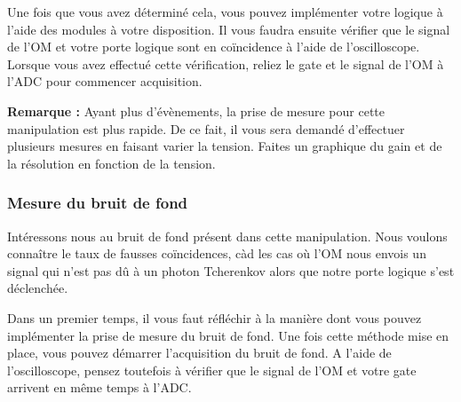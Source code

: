 Une fois que vous avez déterminé cela, vous pouvez implémenter votre logique à l'aide des modules à votre disposition. Il vous faudra ensuite vérifier que le signal de l'OM et votre porte logique sont en coïncidence à l'aide de l'oscilloscope. Lorsque vous avez effectué cette vérification, reliez le gate et le signal de l'OM à l'ADC pour commencer acquisition.

\textbf{Remarque :} Ayant plus d'évènements, la prise de mesure pour cette manipulation est plus rapide. De ce fait, il vous sera demandé d'effectuer plusieurs mesures en faisant varier la tension. Faites un graphique du gain et de la résolution en fonction de la tension.


\subsubsection{Mesure du bruit de fond}
Intéressons nous au bruit de fond présent dans cette manipulation. Nous voulons connaître le taux de fausses coïncidences, càd les cas où l'OM nous envois un signal qui n'est pas dû à un photon Tcherenkov alors que notre porte logique s'est déclenchée.

Dans un premier temps, il vous faut réfléchir à la manière dont vous pouvez implémenter la prise de mesure du bruit de fond. Une fois cette méthode mise en place, vous pouvez démarrer l'acquisition du bruit de fond. A l'aide de l'oscilloscope, pensez toutefois à vérifier que le signal de l'OM et votre gate arrivent en même temps à l'ADC.


